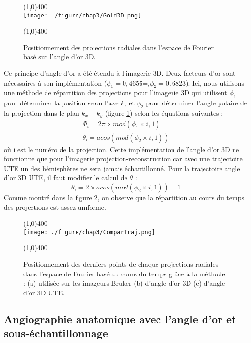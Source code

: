 \begin{figure}[h]
\centering \line(1,0){400} \\
\texttt{[image: ./figure/chap3/Gold3D.png]}
\caption[Angle d'or 3D]{\label{fig:Gold3D} Positionnement des projections radiales dans l'espace de Fourier basé sur l'angle d'or 3D.}
\line(1,0){400} \\ \end{figure}

Ce principe d'angle d'or a été étendu à l'imagerie 3D. Deux facteurs d'or sont nécessaires à son implémentation ($\phi_1=0,4656$=,$\phi_2=0,6823$). Ici, nous utilisons une méthode de répartition des projections pour l'imagerie 3D qui utilisent $\phi_1$ pour déterminer la position selon l'axe $k_z$ et $\phi_2$ pour déterminer l'angle polaire de la projection dans le plan $k_x-k_y$ (figure \ref{fig:Gold3D}) selon les équations suivantes :
\begin{equation}
\label{eq:GoldPremier}
\begin{array}{c}
\Phi_i=2\pi \times mod(\phi_1 \times i,1) \\
\theta_i=acos(mod(\phi_2 \times i,1))
\end{array}
\end{equation}
où i est le numéro de la projection. Cette implémentation de l'angle d'or 3D ne fonctionne que pour l'imagerie projection-reconstruction car avec une trajectoire UTE un des hémisphères ne sera jamais échantillonné. Pour la trajectoire angle d'or 3D UTE, il faut modifier le calcul de $\theta$ :
\begin{equation}
\theta_i=2 \times acos(mod(\phi_2 \times i,1))-1
\end{equation}
Comme montré dans la figure \ref{fig:ComparTraj}, on observe que la répartition au cours du temps des projections est assez uniforme.


\begin{figure}[h]
\centering \line(1,0){400} \\
\texttt{[image: ./figure/chap3/ComparTraj.png]}
\caption[Comparaison entre les trajectoires]{\label{fig:ComparTraj} Positionnement des derniers points de chaque projections radiales dans l'espace de Fourier basé au cours du temps grâce à la méthode : (a) utilisée sur les imageurs Bruker (b) d'angle d'or 3D (c) d'angle d'or 3D UTE.}
\line(1,0){400} \\ \end{figure}

\subsection{Angiographie anatomique avec l'angle d'or et sous-échantillonnage}

